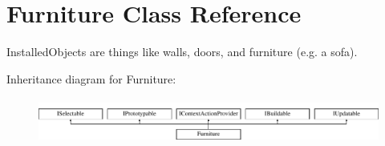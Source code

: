 \hypertarget{class_furniture}{}\section{Furniture Class Reference}
\label{class_furniture}


Installed\+Objects are things like walls, doors, and furniture (e.\+g. a sofa).  


Inheritance diagram for Furniture\+:\begin{figure}[H]
\begin{center}
\leavevmode
\includegraphics[height=1.493333cm]{class_furniture}
\end{center}
\end{figure}
